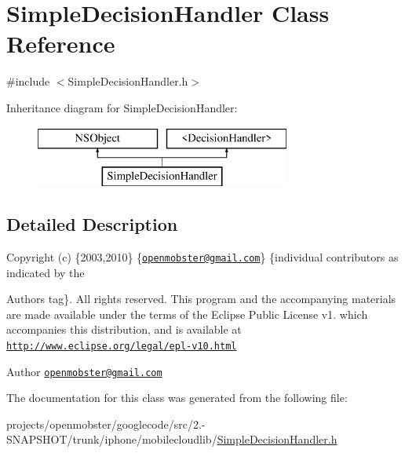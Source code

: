 \hypertarget{interface_simple_decision_handler}{
\section{\-Simple\-Decision\-Handler \-Class \-Reference}
\label{interface_simple_decision_handler}
}


{\ttfamily \#include $<$\-Simple\-Decision\-Handler.\-h$>$}

\-Inheritance diagram for \-Simple\-Decision\-Handler\-:\begin{figure}[H]
\begin{center}
\leavevmode
\includegraphics[height=2.000000cm]{interface_simple_decision_handler}
\end{center}
\end{figure}


\subsection{\-Detailed \-Description}
\-Copyright (c) \{2003,2010\} \{\href{mailto:openmobster@gmail.com}{\tt openmobster@gmail.\-com}\} \{individual contributors as indicated by the \begin{DoxyAuthor}{\-Authors}
tag\}. \-All rights reserved. \-This program and the accompanying materials are made available under the terms of the \-Eclipse \-Public \-License v1. which accompanies this distribution, and is available at \href{http://www.eclipse.org/legal/epl-v10.html}{\tt http\-://www.\-eclipse.\-org/legal/epl-\/v10.\-html}
\end{DoxyAuthor}
\begin{DoxyAuthor}{\-Author}
\href{mailto:openmobster@gmail.com}{\tt openmobster@gmail.\-com} 
\end{DoxyAuthor}


\-The documentation for this class was generated from the following file\-:\begin{DoxyCompactItemize}
\item 
projects/openmobster/googlecode/src/2.-\/\-S\-N\-A\-P\-S\-H\-O\-T/trunk/iphone/mobilecloudlib/\hyperlink{_simple_decision_handler_8h}{\-Simple\-Decision\-Handler.\-h}\end{DoxyCompactItemize}
